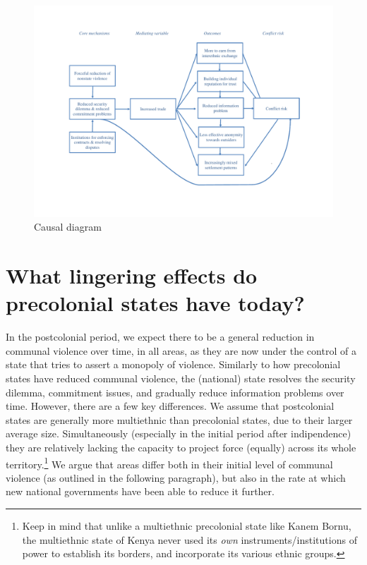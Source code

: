 \documentclass[12pt]{article}
\begin{document}


\begin{figure}[htpb]
	\centering
	\includegraphics[width=0.8\linewidth]{img/Causal diagram.pdf}
	\caption{Causal diagram}
	\label{causal}
\end{figure}

\section{What lingering effects do precolonial states have today?}

In the postcolonial period, we expect there to be a general reduction in
communal violence over time, in all areas, as they are now under the control of
a state that tries to assert a monopoly of violence. Similarly to how
precolonial states have reduced communal violence, the (national) state resolves
the security dilemma, commitment issues, and gradually reduce information
problems over time. However, there are a few key differences. We assume that
postcolonial states are generally more multiethnic than precolonial states, due
to their larger average size. Simultaneously (especially in the initial period
after indipendence) they are relatively lacking the capacity to project force
(equally) across its whole territory.\footnote{Keep in mind that unlike a
multiethnic precolonial state like Kanem Bornu, the multiethnic state of Kenya
never used its \textit{own} instruments/institutions of power to establish its
borders, and incorporate its various ethnic groups.} We argue that areas differ
both in their initial level of communal violence (as outlined in the following
paragraph), but also in the rate at which new national governments have been
able to reduce it further.
\end{document}

